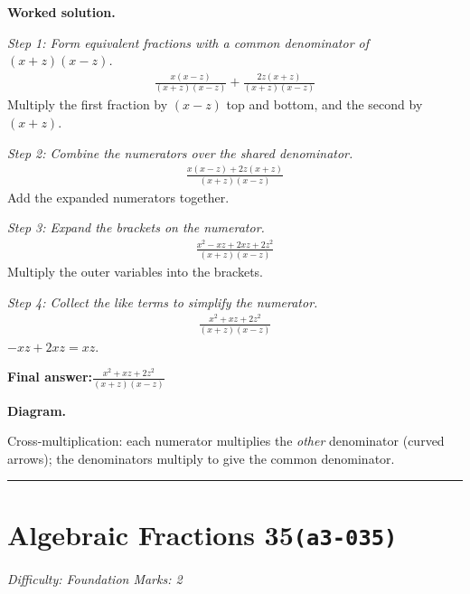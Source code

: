 \documentclass[11pt]{article}
\begin{document}
\textbf{Worked solution.}

\textit{Step 1: Form equivalent fractions with a common denominator of \( (x+z)(x-z) \).}
\[\begin{gathered}
\frac{x(x-z)}{(x+z)(x-z)} + \frac{2z(x+z)}{(x+z)(x-z)}
\end{gathered}\]
Multiply the first fraction by \( (x-z) \) top and bottom, and the second by \( (x+z) \).

\textit{Step 2: Combine the numerators over the shared denominator.}
\[\begin{gathered}
\frac{x(x-z) + 2z(x+z)}{(x+z)(x-z)}
\end{gathered}\]
Add the expanded numerators together.

\textit{Step 3: Expand the brackets on the numerator.}
\[\begin{gathered}
\frac{x^2 - xz + 2xz + 2z^2}{(x+z)(x-z)}
\end{gathered}\]
Multiply the outer variables into the brackets.

\textit{Step 4: Collect the like terms to simplify the numerator.}
\[\begin{gathered}
\frac{x^2 + xz + 2z^2}{(x+z)(x-z)}
\end{gathered}\]
\( -xz + 2xz = xz \).

\begin{answerbox}
\textbf{Final answer:}\quad \(\displaystyle \frac{x^2 + xz + 2z^2}{(x+z)(x-z)}\)
\end{answerbox}
\textbf{Diagram.}

\begin{center}
\end{center}
\small Cross-multiplication: each numerator multiplies the \emph{other} denominator (curved arrows); the denominators multiply to give the common denominator.\normalsize

\medskip\hrule

\section*{Algebraic Fractions 35\quad\small\texttt{(a3-035)}}
\textit{Difficulty: Foundation \quad\textbar\quad Marks: 2}
\end{document}
